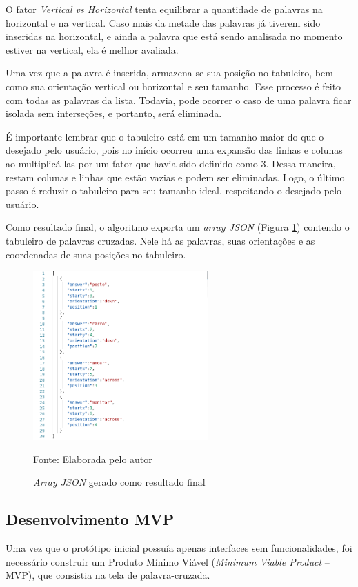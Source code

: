 O fator \textit{Vertical vs Horizontal} tenta equilibrar a quantidade de palavras na horizontal e na vertical. Caso mais da metade das palavras já tiverem sido inseridas na horizontal, e ainda a palavra que está sendo analisada no momento estiver na vertical, ela é melhor avaliada.

Uma vez que a palavra é inserida, armazena-se sua posição no tabuleiro, bem como sua orientação vertical ou horizontal e seu tamanho. Esse processo é feito com todas as palavras da lista. Todavia, pode ocorrer o caso de uma palavra ficar isolada sem interseções, e portanto, será eliminada. 

É importante lembrar que o tabuleiro está em um tamanho maior do que o desejado pelo usuário, pois no início ocorreu uma expansão das linhas e colunas ao multiplicá-las por um fator que havia sido definido como 3. Dessa maneira, restam colunas e linhas que estão vazias e podem ser eliminadas. Logo, o último passo é reduzir o tabuleiro para seu tamanho ideal, respeitando o desejado pelo usuário. 

Como resultado final, o algoritmo exporta um \textit{array JSON} (Figura \ref{fig:json}) contendo o tabuleiro de palavras cruzadas. Nele há as palavras, suas orientações e as coordenadas de suas posições no tabuleiro.

\begin{figure}[H]
\centering
    \caption{\textit{Array JSON} gerado como resultado final}
    \label{fig:json}
    \includegraphics[width=0.6\textwidth]{Figuras/codeJSONresult.png}
    
    Fonte: Elaborada pelo autor
\end{figure}

\subsection{Desenvolvimento MVP}
Uma vez que o protótipo inicial possuía apenas interfaces sem funcionalidades, foi necessário construir um Produto Mínimo Viável (\textit{Minimum Viable Product} -- MVP), que consistia na tela de palavra-cruzada.

